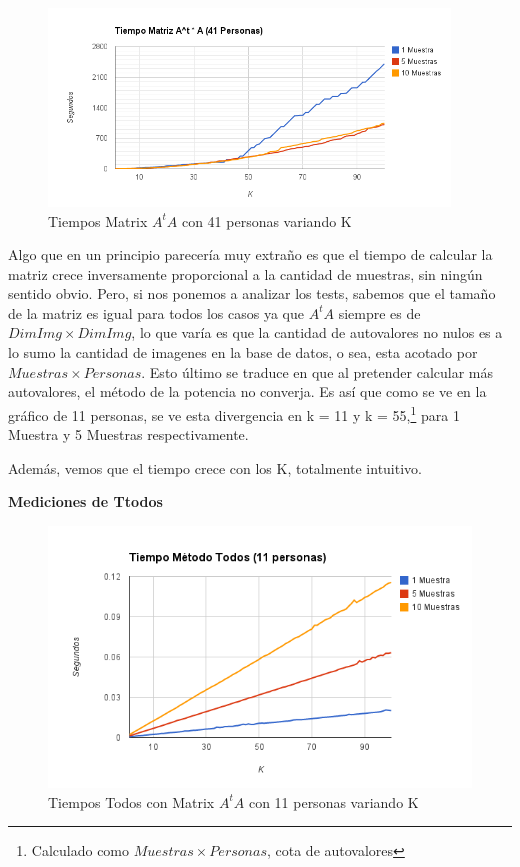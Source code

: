 \begin{figure}[H]
\includegraphics[width=0.95\textwidth]{img/image3.png}
     \caption{Tiempos Matrix $A^tA$ con 41 personas variando K}
\end{figure}

Algo que en un principio parecería muy extraño es que el tiempo de calcular la matriz crece
inversamente proporcional a la cantidad de muestras, sin ningún sentido obvio. Pero, si nos ponemos
a analizar los tests, sabemos que el tamaño de la matriz es igual para todos los casos ya que $A^tA$
siempre es de $DimImg \times DimImg$, lo que var\'ia es que la cantidad de autovalores no nulos es a
lo sumo la cantidad de imagenes en la base de datos, o sea, esta acotado por $Muestras \times
Personas$. Esto \'ultimo se traduce en que al pretender calcular m\'as autovalores, el m\'etodo de
la potencia no converja. Es as\'i que como se ve en la gr\'afico de 11 personas, se ve esta
divergencia en k = 11 y k = 55,\footnote{Calculado como $Muestras \times Personas$, cota de
  autovalores} para 1 Muestra y 5 Muestras respectivamente.

Además, vemos que el tiempo crece con los K, totalmente intuitivo.

\textbf{Mediciones de Ttodos }

\begin{figure}[H]
\includegraphics[width=1\textwidth]{img/image4.png}
     \caption{Tiempos Todos con Matrix $A^tA$ con 11 personas variando K}
\end{figure}

